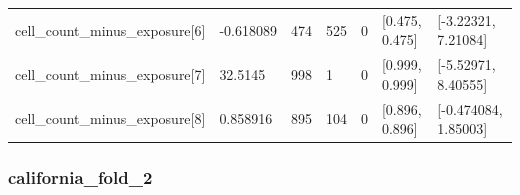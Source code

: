 \begin{longtable}
{}cell\_\allowbreak{}count\_\allowbreak{}minus\_\allowbreak{}exposure[6] & -0.618089 & 474 & 525 & 0 & [0.475, 0.475] & [-3.22321, 7.21084] \\
{}cell\_\allowbreak{}count\_\allowbreak{}minus\_\allowbreak{}exposure[7] & 32.5145 & 998 & 1 & 0 & [0.999, 0.999] & [-5.52971, 8.40555] \\
{}cell\_\allowbreak{}count\_\allowbreak{}minus\_\allowbreak{}exposure[8] & 0.858916 & 895 & 104 & 0 & [0.896, 0.896] & [-0.474084, 1.85003] \\
\end{longtable}\endgroup

\subsubsection{california\_\allowbreak{}fold\_\allowbreak{}2}


